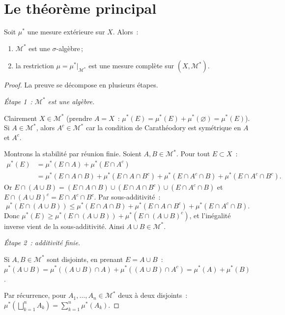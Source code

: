 \section{Le th\'eor\`eme principal}

\begin{theoreme}
\label{thm:caratheodory}
Soit $\mu^*$ une mesure ext\'erieure sur $X$. Alors~:
\begin{enumerate}
    \item $\mathcal{M}^*$ est une $\sigma$-alg\`ebre\,;
    \item la restriction $\mu = \mu^*|_{\mathcal{M}^*}$ est une mesure compl\`ete
    sur $(X, \mathcal{M}^*)$.
\end{enumerate}
\end{theoreme}

\begin{proof}
La preuve se d\'ecompose en plusieurs \'etapes.

\emph{\'Etape 1~: $\mathcal{M}^*$ est une alg\`ebre.}

Clairement $X \in \mathcal{M}^*$ (prendre $A = X$~: $\mu^*(E) = \mu^*(E) +
\mu^*(\varnothing) = \mu^*(E)$). Si $A \in \mathcal{M}^*$, alors $A^c \in
\mathcal{M}^*$ car la condition de Carath\'eodory est sym\'etrique en $A$ et $A^c$.

Montrons la stabilit\'e par r\'eunion finie. Soient $A, B \in \mathcal{M}^*$. Pour
tout $E \subset X$~:
\begin{align*}
\mu^*(E) &= \mu^*(E \cap A) + \mu^*(E \cap A^c) \\
&= \mu^*(E \cap A \cap B) + \mu^*(E \cap A \cap B^c) + \mu^*(E \cap A^c \cap B)
+ \mu^*(E \cap A^c \cap B^c).
\end{align*}
Or $E \cap (A \cup B) = (E \cap A \cap B) \cup (E \cap A \cap B^c) \cup
(E \cap A^c \cap B)$ et $E \cap (A \cup B)^c = E \cap A^c \cap B^c$. Par
sous-additivit\'e~:
\[
\mu^*(E \cap (A \cup B)) \leq \mu^*(E \cap A \cap B) + \mu^*(E \cap A \cap B^c)
+ \mu^*(E \cap A^c \cap B).
\]
Donc $\mu^*(E) \geq \mu^*(E \cap (A \cup B)) + \mu^*(E \cap (A \cup B)^c)$, et
l'in\'egalit\'e inverse vient de la sous-additivit\'e. Ainsi $A \cup B \in
\mathcal{M}^*$.

\emph{\'Etape 2~: additivit\'e finie.}

Si $A, B \in \mathcal{M}^*$ sont disjoints, en prenant $E = A \cup B$~:
$\mu^*(A \cup B) = \mu^*((A \cup B) \cap A) + \mu^*((A \cup B) \cap A^c)
= \mu^*(A) + \mu^*(B)$.

Par r\'ecurrence, pour $A_1, \ldots, A_n \in \mathcal{M}^*$ deux \`a deux disjoints~:
$\mu^*\!\left(\bigsqcup_{k=1}^n A_k\right) = \sum_{k=1}^n \mu^*(A_k)$.


\end{proof}

